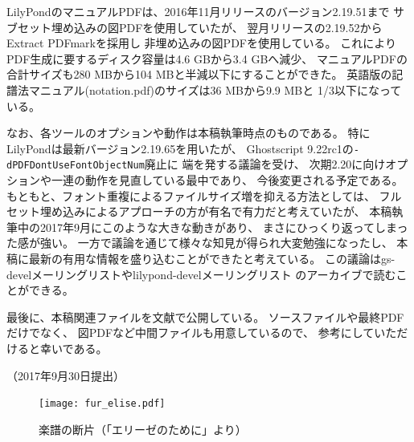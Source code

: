 \documentclass[twocolumn,jafontscale=0.962216,jlreq_notes]{jlreq}
\begin{document}
LilyPondのマニュアルPDFは、2016年11月リリースのバージョン2.19.51まで
サブセット埋め込みの図PDFを使用していたが、
翌月リリースの2.19.52からExtract PDFmarkを採用し
非埋め込みの図PDFを使用している。
これによりPDF生成に要するディスク容量は4.6 GBから3.4 GBへ減少、
マニュアルPDFの合計サイズも280 MBから104 MBと半減以下にすることができた。
英語版の記譜法マニュアル(notation.pdf)のサイズは36 MBから9.9 MBと
1/3以下になっている\cite{issue5000}。

なお、各ツールのオプションや動作は本稿執筆時点のものである。
特にLilyPondは最新バージョン2.19.65を用いたが、
Ghostscript 9.22rc1の\verb|-dPDFDontUseFontObjectNum|廃止に
端を発する議論を受け、
次期2.20に向けオプションや一連の動作を見直している最中であり、
今後変更される予定である。
もともと、フォント重複によるファイルサイズ増を抑える方法としては、
フルセット埋め込みによるアプローチの方が有名で有力だと考えていたが、
本稿執筆中の2017年9月にこのような大きな動きがあり、
まさにひっくり返ってしまった感が強い。
一方で議論を通じて様々な知見が得られ大変勉強になったし、
本稿に最新の有用な情報を盛り込むことができたと考えている。
この議論はgs-develメーリングリストやlilypond-develメーリングリスト
のアーカイブで読むことができる\cite{gs-devel}\cite{lilypond-devel}。

最後に、本稿関連ファイルを文献\cite{tr-texconf2017}で公開している。
ソースファイルや最終PDFだけでなく、
図PDFなど中間ファイルも用意しているので、
参考にしていただけると幸いである。

\begin{flushright}
（2017年9月30日提出）
\end{flushright}

\begin{figure}
  \centering
  \texttt{[image: fur\_elise.pdf]}
  \caption{楽譜の断片（「エリーゼのために」より）}
  \label{fig:fur_elise}
\end{figure}
\end{document}
